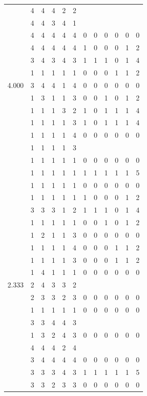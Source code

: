 \documentclass[]{book}
\theoremstyle{definition}
\theoremstyle{definition}
\theoremstyle{definition}
\theoremstyle{remark}
\begin{document}
\begin{table}
{\begin{tabular}[t]{rrrrrrrrrrrr}
 & 4 & 4 & 4 & 2 & 2 &  &  &  &  &  & \\
 & 4 & 4 & 3 & 4 & 1 &  &  &  &  &  & \\
 & 4 & 4 & 4 & 4 & 4 & 0 & 0 & 0 & 0 & 0 & 0\\
 & 4 & 4 & 4 & 4 & 4 & 1 & 0 & 0 & 0 & 1 & 2\\
 & 3 & 4 & 3 & 4 & 3 & 1 & 1 & 1 & 0 & 1 & 4\\
 & 1 & 1 & 1 & 1 & 1 & 0 & 0 & 0 & 1 & 1 & 2\\
4.000 & 3 & 4 & 4 & 1 & 4 & 0 & 0 & 0 & 0 & 0 & 0\\
 & 1 & 3 & 1 & 1 & 3 & 0 & 0 & 1 & 0 & 1 & 2\\
 & 1 & 1 & 1 & 3 & 2 & 1 & 0 & 1 & 1 & 1 & 4\\
 & 1 & 1 & 1 & 1 & 3 & 1 & 0 & 1 & 1 & 1 & 4\\
 & 1 & 1 & 1 & 1 & 4 & 0 & 0 & 0 & 0 & 0 & 0\\
 & 1 & 1 & 1 & 1 & 3 &  &  &  &  &  & \\
 & 1 & 1 & 1 & 1 & 1 & 0 & 0 & 0 & 0 & 0 & 0\\
 & 1 & 1 & 1 & 1 & 1 & 1 & 1 & 1 & 1 & 1 & 5\\
 & 1 & 1 & 1 & 1 & 1 & 0 & 0 & 0 & 0 & 0 & 0\\
 & 1 & 1 & 1 & 1 & 1 & 1 & 0 & 0 & 0 & 1 & 2\\
 & 3 & 3 & 3 & 1 & 2 & 1 & 1 & 1 & 0 & 1 & 4\\
 & 1 & 1 & 1 & 1 & 1 & 0 & 0 & 1 & 0 & 1 & 2\\
 & 1 & 2 & 1 & 1 & 3 & 0 & 0 & 0 & 0 & 0 & 0\\
 & 1 & 1 & 1 & 1 & 4 & 0 & 0 & 0 & 1 & 1 & 2\\
 & 1 & 1 & 1 & 1 & 3 & 0 & 0 & 0 & 1 & 1 & 2\\
 & 1 & 4 & 1 & 1 & 1 & 0 & 0 & 0 & 0 & 0 & 0\\
2.333 & 2 & 4 & 3 & 3 & 2 &  &  &  &  &  & \\
 & 2 & 3 & 3 & 2 & 3 & 0 & 0 & 0 & 0 & 0 & 0\\
 & 1 & 1 & 1 & 1 & 1 & 0 & 0 & 0 & 0 & 0 & 0\\
 & 3 & 3 & 4 & 4 & 3 &  &  &  &  &  & \\
 & 1 & 3 & 2 & 4 & 3 & 0 & 0 & 0 & 0 & 0 & 0\\
 & 4 & 4 & 4 & 2 & 4 &  &  &  &  &  & \\
 & 3 & 4 & 4 & 4 & 4 & 0 & 0 & 0 & 0 & 0 & 0\\
 & 3 & 3 & 3 & 4 & 3 & 1 & 1 & 1 & 1 & 1 & 5\\
 & 3 & 3 & 2 & 3 & 3 & 0 & 0 & 0 & 0 & 0 & 0\\

\end{tabular}}
\end{table}
\end{document}
